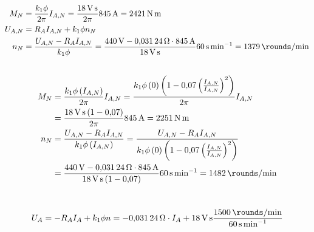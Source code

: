 \documentclass[11pt,a4paper]{scrartcl}
\newcommand{\mybr}[1]{\left(#1\right)}
\newcommand{\0}{_{\mybr{0}}}
\newcommand{\1}{_{\mybr{1}}}
\newcommand{\2}{_{\mybr{2}}}
\begin{document}
\section{}
\subsection{}
\begin{align}
M_N&=\frac{k_1\phi}{2\pi}I_{A,N}=\frac{\SI{18}{\volt\second}}{2\pi}\SI{845}{\ampere}=\SI{2421}{\newton\metre}\\
U_{A,N}&=R_A I_{A,N} + k_1\phi n_N\\
n_N&=\frac{U_{A,N}-R_A I_{A,N}}{k_1\phi}=\frac{\SI{440}{\volt}-\SI{0.03124}{\ohm}\cdot\SI{845}{\ampere}}{\SI{18}{\volt\second}}\SI{60}{\second\per\minute}=\SI{1379}{\rounds\per\minute}
\end{align}
\subsection{}
\begin{align}
M_N&=\frac{k_1\phi\mybr{I_{A,N}}}{2\pi}I_{A,N}=\frac{k_1\phi\mybr{0}\mybr{1-\num{0.07}\mybr{\frac{I_{A,N}}{I_{A,N}}}^2}}{2\pi}I_{A,N}\\
&=\frac{\SI{18}{\volt\second}\mybr{1-\num{0.07}}}{2\pi}\SI{845}{\ampere}=\SI{2251}{\newton\metre}\\
n_N&=\frac{U_{A,N}-R_A I_{A,N}}{k_1\phi\mybr{I_{A,N}}}=\frac{U_{A,N}-R_A I_{A,N}}{k_1\phi\mybr{0}\mybr{1-\num{0.07}\mybr{\frac{I_{A,N}}{I_{A,N}}}^2}}\\
&=\frac{\SI{440}{\volt}-\SI{0.03124}{\ohm}\cdot\SI{845}{\ampere}}{\SI{18}{\volt\second}\mybr{1-\num{0.07}}}\SI{60}{\second\per\minute}=\SI{1482}{\rounds\per\minute}
\end{align}

\section{}
\subsection{}
\begin{equation}
U_A=-R_A I_A + k_1\phi n=-\SI{0.03124}{\ohm}\cdot I_A+\SI{18}{\volt\second}\frac{\SI{1500}{\rounds\per\minute}}{\SI{60}{\second\per\minute}}
\end{equation}
\end{document}
